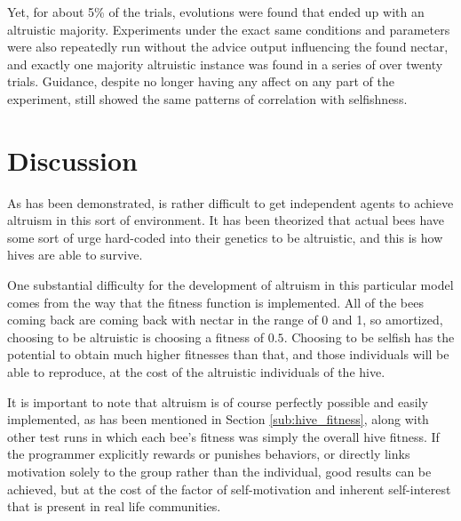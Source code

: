 \documentclass[twoside]{article}
\begin{document}
\begin{multicols}{2}
            Yet, for about 5\% of the trials, evolutions were found that ended up with an altruistic majority. Experiments under the exact same conditions and parameters were also repeatedly run without the advice output influencing the found nectar, and exactly one majority altruistic instance was found in a series of over twenty trials. Guidance, despite no longer having any affect on any part of the experiment, still showed the same patterns of correlation with selfishness.  


	\section{Discussion} %
	\label{sec:discussion}

		As has been demonstrated, is rather difficult to get independent agents to achieve altruism in this sort of environment. It has been theorized that actual bees have some sort of urge hard-coded into their genetics to be altruistic, and this is how hives are able to survive. \cite{macy}

		One substantial difficulty for the development of altruism in this particular model comes from the way that the fitness function is implemented. All of the bees coming back are coming back with nectar in the range of 0 and 1, so amortized, choosing to be altruistic is choosing a fitness of $0.5$. Choosing to be selfish has the potential to obtain much higher fitnesses than that, and those individuals will be able to reproduce, at the cost of the altruistic individuals of the hive.

		It is important to note that altruism is of course perfectly possible and easily implemented, as has been mentioned in Section \ref{sub:hive_fitness}, along with other test runs in which each bee's fitness was simply the overall hive fitness. If the programmer explicitly rewards or punishes behaviors, or directly links motivation solely to the group rather than the individual, good results can be achieved, but at the cost of the factor of self-motivation and inherent self-interest that is present in real life communities. 


\end{multicols}
\end{document}
